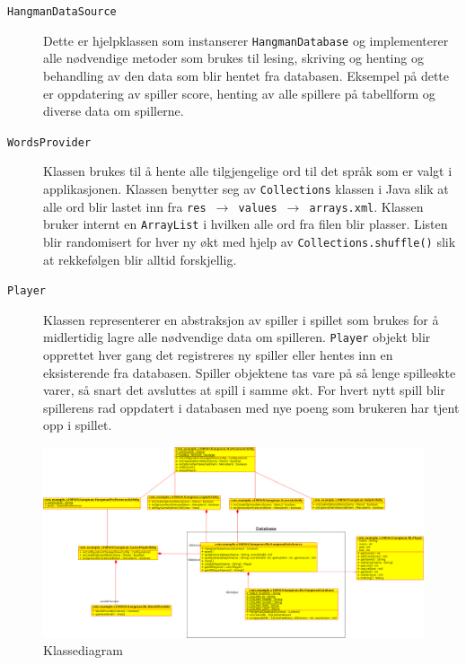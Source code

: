 \begin{description}
\begin{description}
\item[\texttt{HangmanDataSource}]
Dette er hjelpklassen som instanserer \texttt{HangmanDatabase} og implementerer alle nødvendige metoder som brukes til lesing, skriving og henting og behandling av den data som blir hentet fra databasen. Eksempel på dette er oppdatering av spiller score, henting av alle spillere på tabellform og diverse data om spillerne.

\item[\texttt{WordsProvider}]
Klassen brukes til å hente alle tilgjengelige ord til det språk som er valgt i applikasjonen. Klassen benytter seg av \texttt{Collections} klassen i Java slik at alle ord blir lastet inn fra \texttt{res $\rightarrow$ values $\rightarrow$ arrays.xml}. Klassen bruker internt en \texttt{ArrayList} i hvilken alle ord fra filen blir plasser. Listen blir randomisert for hver ny økt med hjelp av \texttt{Collections.shuffle()} slik at rekkefølgen blir alltid forskjellig. 


\item[\texttt{Player}]
Klassen representerer en abstraksjon av spiller i spillet som brukes for å midlertidig lagre alle nødvendige data om spilleren. \texttt{Player} objekt blir opprettet hver gang det registreres ny spiller eller hentes inn en eksisterende fra databasen. Spiller objektene tas vare på så lenge spilleøkte varer, så snart det avsluttes at spill i samme økt. For hvert nytt spill blir spillerens rad oppdatert i databasen med nye poeng som brukeren har tjent opp i spillet.

\end{description}


\end{description}


\begin{landscape}
\begin{figure}[ht]
\centering
 \includegraphics[width=\hsize]{./uml/classdiagram.png}
 \caption{Klassediagram}
 \label{fig:klassediagram}
\end{figure}

\end{landscape}



